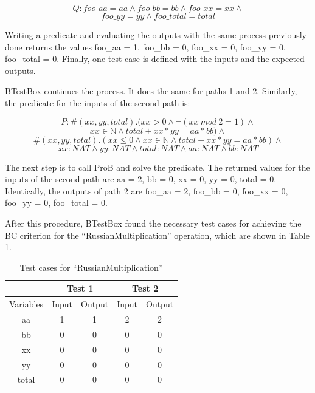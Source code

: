 \documentclass[runningheads]{llncs}
\begin{document}
$$Q : foo\_aa = aa \wedge foo\_bb = bb \wedge foo\_xx = xx \wedge$$
$$foo\_yy = yy \wedge foo\_total = total$$

Writing a predicate and evaluating the outputs with the same process previously done returns the values foo\_aa = 1, foo\_bb = 0, foo\_xx = 0, foo\_yy = 0, foo\_total = 0. Finally, one test case is defined with the inputs and the expected outputs.

BTestBox continues the process. It does the same for paths 1 and 2. Similarly, the predicate for the inputs of the second path is:

$$P: \#(xx, yy, total).(xx > 0 \wedge \neg(xx\ mod\ 2 = 1) \wedge$$
$$ xx \in \mathbb{N} \wedge total + xx * yy = aa * bb) \wedge$$
$$\#(xx, yy, total).(xx \leq 0 \wedge xx \in \mathbb{N} \wedge total + xx * yy = aa * bb) \wedge$$
$$xx : NAT \wedge yy : NAT \wedge total : NAT \wedge aa : NAT \wedge bb : NAT$$

The next step is to call ProB and solve the predicate. The returned values for the inputs of the second path are aa = 2, bb = 0, xx = 0, yy = 0, total = 0. Identically, the outputs of path 2 are foo\_aa = 2, foo\_bb = 0, foo\_xx = 0, foo\_yy = 0, foo\_total = 0.

After this procedure, BTestBox found the necessary test cases for achieving the BC criterion for the ``RussianMultiplication'' operation, which are shown in Table \ref{tab:TestCases}.


\begin{table}[h]
\centering
\caption{Test cases for ``RussianMultiplication''}
\begin{tabular}{c|c|c|c|c|}
\cline{2-5}
                                & \multicolumn{2}{c|}{Test 1} & \multicolumn{2}{c|}{Test 2} \\ \hline
\multicolumn{1}{|c|}{Variables} & Input        & Output       & Input        & Output       \\ \hline
\multicolumn{1}{|c|}{aa}        & 1            & 1            & 2            & 2            \\ \hline
\multicolumn{1}{|c|}{bb}        & 0            & 0            & 0            & 0            \\ \hline
\multicolumn{1}{|c|}{xx}        & 0            & 0            & 0            & 0            \\ \hline
\multicolumn{1}{|c|}{yy}        & 0            & 0            & 0            & 0            \\ \hline
\multicolumn{1}{|c|}{total}     & 0            & 0            & 0            & 0            \\ \hline
\end{tabular}
\label{tab:TestCases}
\end{table}
\end{document}
